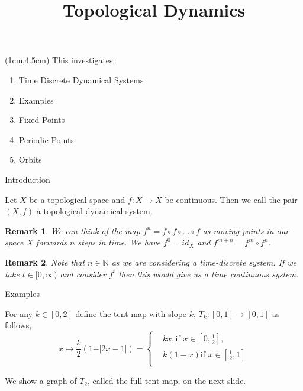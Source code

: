 \documentclass{beamer}
\title{Topological Dynamics}
\author{}
\date{}
\newtheorem*{remark}{Remark}
\begin{document}
\begin{frame}
    \titlepage 
    
    
\begin{textblock*}{10cm}(1cm,4.5cm)
This investigates:
\begin{enumerate}
        \item Time Discrete Dynamical Systems
        \item Examples
        \item Fixed Points
        \item Periodic Points
        \item Orbits
    \end{enumerate}
\end{textblock*}    
\end{frame}

\logo{}


\begin{frame}{Introduction}
\begin{definition}
Let $X$ be a topological space and $f:X\to X$ be continuous. Then we call the pair $(X,f)$ a \underline{topological dynamical system}. 
\end{definition}

\begin{remark}
    We can think of the map $f^{n}=f\circ f\circ \dots \circ f$ as moving points in our space $X$ forwards $n$ steps in time.
    We have $f^{0}=id_{X}$ and $f^{m+n}=f^{m}\circ f^{n}$.
\end{remark}

\begin{remark}
    Note that $n\in\mathbb{N}$ as we are considering a time-discrete system.
    If we take $t\in[0,\infty)$ and consider $f^{t}$ then this would give us a time continuous system.
\end{remark}

\end{frame}



\begin{frame}{Examples}
\begin{example}
For any $k\in[0,2]$ define the tent map with slope $k$, $T_{k}:[0,1]\to[0,1]$ as follows,
\begin{equation*}
x\mapsto\frac{k}{2}(1-\vert2x-1\vert)=
\begin{cases}
    & kx, \text{if } x\in[0,\frac{1}{2}], \\
    & k(1-x) \text{if } x\in[\frac{1}{2},1]\\
\end{cases}
\end{equation*}

\end{example}
We show a graph of $T_{2}$, called the full tent map, on the next slide.
\end{frame}
    
\end{document}
